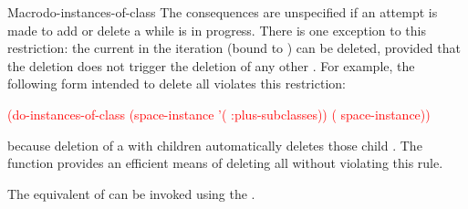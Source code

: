 \documentclass[10pt,twoside,english,pdftex]{article}
\begin{document}
\begin{functiondoc}{Macro}{do-instances-of-class}
\fnnote {}%
%
%
The consequences are unspecified if an attempt is made to add or delete a
 while  is in
progress.  There is one exception to this restriction: the current
 in the iteration (bound to ) can be deleted,
provided that the deletion does not trigger the deletion of any other
.  For example, the following form intended to delete
all  violates this restriction:
%
\W\supp
\begin{example}
   \textcolor{red}{(do-instances-of-class (space-instance 
                             '( :plus-subclasses))
     ( space-instance))}
\end{example}
%
because deletion of a  with children automatically
deletes those child .  The function
 provides an efficient
means of deleting all  without violating this rule.

\replnote 
%
%
%
The equivalent of 
can be invoked using the  .

\end{functiondoc}

\end{document}

